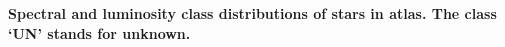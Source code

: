 {\bf  Spectral and luminosity class distributions of stars in atlas.  The class `UN' stands for unknown.\label{fig:hiso-spt-type}}